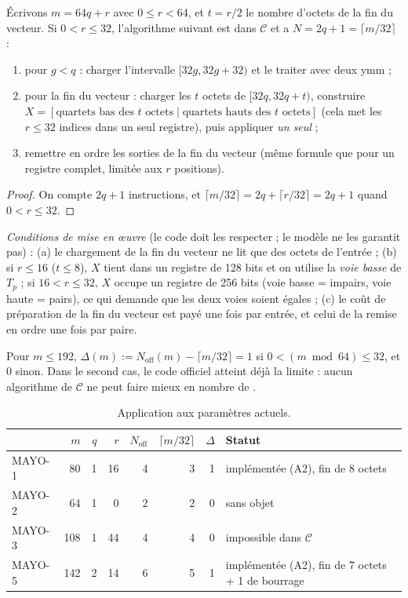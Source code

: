 \begin{proposition}\label{prop:real}
Écrivons $m=64q+r$ avec $0\le r<64$, et $t=r/2$ le nombre d'octets de la fin du vecteur. Si $0<r\le32$, l'algorithme suivant est dans $\mathcal{C}$ et a $N=2q+1=\lceil m/32\rceil$ :
\begin{enumerate}[nosep]
\item pour $g<q$ : charger l'intervalle $[32g,32g+32)$ et le traiter avec deux \vpshufb{} ymm ;
\item pour la fin du vecteur : charger les $t$ octets de $[32q,32q+t)$, construire $X=[\text{quartets bas des }t\text{ octets}\mid\text{quartets hauts des }t\text{ octets}]$ (cela met les $r\le32$ indices dans un seul registre), puis appliquer \emph{un seul} \vpshufb{} ;
\item remettre en ordre les sorties de la fin du vecteur (même formule que pour un registre complet, limitée aux $r$ positions).
\end{enumerate}
\end{proposition}
\begin{proof}
On compte $2q+1$ instructions, et $\lceil m/32\rceil=2q+\lceil r/32\rceil=2q+1$ quand $0<r\le32$.
\end{proof}
\emph{Conditions de mise en œuvre} (le code doit les respecter ; le modèle ne les garantit pas) : (a) le chargement de la fin du vecteur ne lit que des octets de l'entrée ; (b) si $r\le16$ ($t\le8$), $X$ tient dans un registre de 128 bits et on utilise la \emph{voie basse} de $T_p$ ; si $16<r\le32$, $X$ occupe un registre de 256 bits (voie basse = impairs, voie haute = pairs), ce qui demande que les deux voies soient égales ; (c) le coût de préparation de la fin du vecteur est payé une fois par entrée, et celui de la remise en ordre une fois par paire.

\begin{corollaire}
Pour $m\le192$, $\Delta(m):=N_{\mathrm{off}}(m)-\lceil m/32\rceil=1$ si $0<(m\bmod64)\le32$, et $0$ sinon. Dans le second cas, le code officiel atteint déjà la limite : aucun algorithme de $\mathcal{C}$ ne peut faire mieux en nombre de \vpshufb{}.
\end{corollaire}

\begin{table}[ht]\centering\small
\caption{Application aux paramètres actuels.}\label{tab:delta}
\begin{tabular}{@{}lrrrrrrl@{}}\toprule
 & $m$ & $q$ & $r$ & $N_{\mathrm{off}}$ & $\lceil m/32\rceil$ & $\Delta$ & Statut\\\midrule
MAYO-1 & 80 & 1 & 16 & 4 & 3 & 1 & implémentée (A2), fin de 8 octets\\
MAYO-2 & 64 & 1 & 0 & 2 & 2 & 0 & sans objet\\
MAYO-3 & 108 & 1 & 44 & 4 & 4 & 0 & impossible dans $\mathcal{C}$\\
MAYO-5 & 142 & 2 & 14 & 6 & 5 & 1 & implémentée (A2), fin de 7 octets + 1 de bourrage\\\bottomrule
\end{tabular}
\end{table}

